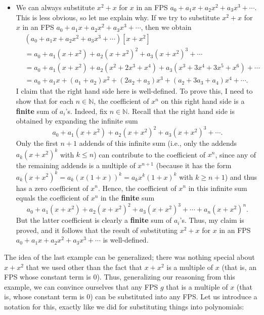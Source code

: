 \begin{itemize}
\item We can always substitute $x^{2}+x$ for $x$ in an FPS $a_{0}+a_{1}%
x+a_{2}x^{2}+a_{3}x^{3}+\cdots$. This is less obvious, so let me explain why.
If we try to substitute $x^{2}+x$ for $x$ in an FPS $a_{0}+a_{1}x+a_{2}%
x^{2}+a_{3}x^{3}+\cdots$, then we obtain%
\begin{align*}
&  \left(  a_{0}+a_{1}x+a_{2}x^{2}+a_{3}x^{3}+\cdots\right)  \left[
x+x^{2}\right] \\
&  =a_{0}+a_{1}\left(  x+x^{2}\right)  +a_{2}\left(  x+x^{2}\right)
^{2}+a_{3}\left(  x+x^{2}\right)  ^{3}+\cdots\\
&  =a_{0}+a_{1}\left(  x+x^{2}\right)  +a_{2}\left(  x^{2}+2x^{3}%
+x^{4}\right)  +a_{3}\left(  x^{3}+3x^{4}+3x^{5}+x^{6}\right)  +\cdots\\
&  =a_{0}+a_{1}x+\left(  a_{1}+a_{2}\right)  x^{2}+\left(  2a_{2}%
+a_{3}\right)  x^{3}+\left(  a_{2}+3a_{3}+a_{4}\right)  x^{4}+\cdots.
\end{align*}
I claim that the right hand side here is well-defined. To prove this, I need
to show that for each $n\in\mathbb{N}$, the coefficient of $x^{n}$ on this
right hand side is a \textbf{finite} sum of $a_{i}$'s. Indeed, fix
$n\in\mathbb{N}$. Recall that the right hand side is obtained by expanding the
infinite sum%
\[
a_{0}+a_{1}\left(  x+x^{2}\right)  +a_{2}\left(  x+x^{2}\right)  ^{2}%
+a_{3}\left(  x+x^{2}\right)  ^{3}+\cdots.
\]
Only the first $n+1$ addends of this infinite sum (i.e., only the addends
$a_{k}\left(  x+x^{2}\right)  ^{k}$ with $k\leq n$) can contribute to the
coefficient of $x^{n}$, since any of the remaining addends is a multiple of
$x^{n+1}$ (because it has the form $a_{k}\left(  x+x^{2}\right)  ^{k}%
=a_{k}\left(  x\left(  1+x\right)  \right)  ^{k}=a_{k}x^{k}\left(  1+x\right)
^{k}$ with $k\geq n+1$) and thus has a zero coefficient of $x^{n}$. Hence, the
coefficient of $x^{n}$ in this infinite sum equals the coefficient of $x^{n}$
in the \textbf{finite} sum
\[
a_{0}+a_{1}\left(  x+x^{2}\right)  +a_{2}\left(  x+x^{2}\right)  ^{2}%
+a_{3}\left(  x+x^{2}\right)  ^{3}+\cdots+a_{n}\left(  x+x^{2}\right)  ^{n}.
\]
But the latter coefficient is clearly a \textbf{finite} sum of $a_{i}$'s.
Thus, my claim is proved, and it follows that the result of substituting
$x^{2}+x$ for $x$ in an FPS $a_{0}+a_{1}x+a_{2}x^{2}+a_{3}x^{3}+\cdots$ is well-defined.
\end{itemize}

The idea of the last example can be generalized; there was nothing special
about $x+x^{2}$ that we used other than the fact that $x+x^{2}$ is a multiple
of $x$ (that is, an FPS whose constant term is $0$). Thus, generalizing our
reasoning from this example, we can convince ourselves that any FPS $g$ that
is a multiple of $x$ (that is, whose constant term is $0$) can be substituted
into any FPS. Let us introduce a notation for this, exactly like we did for
substituting things into polynomials:

